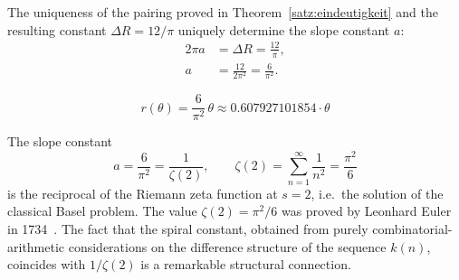 The uniqueness of the pairing proved in Theorem~\ref{satz:eindeutigkeit}
and the resulting constant $\Delta R = 12/\pi$ uniquely determine
the slope constant $a$:
\begin{align}
  2\pi a &= \Delta R = \frac{12}{\pi},\\[4pt]
  a &= \frac{12}{2\pi^2} = \frac{6}{\pi^2}.
\end{align}

\begin{theorem}
\begin{equation}
  \boxed{
    r(\theta) = \frac{6}{\pi^2}\,\theta
    \approx 0.607927101854 \cdot \theta
  }
\end{equation}
\end{theorem}

\begin{remark}
The slope constant
\[
  a = \frac{6}{\pi^2} = \frac{1}{\zeta(2)},
  \qquad
  \zeta(2) = \sum_{n=1}^{\infty} \frac{1}{n^2} = \frac{\pi^2}{6}
\]
is the reciprocal of the Riemann zeta function at $s=2$, i.e.\ the
solution of the classical Basel problem. The value $\zeta(2) = \pi^2/6$
was proved by Leonhard Euler in 1734~\cite{Euler1740,Hardy2008}. The fact
that the spiral constant, obtained from purely combinatorial-arithmetic
considerations on the difference structure of the sequence $k(n)$,
coincides with $1/\zeta(2)$ is a remarkable structural connection.
\end{remark}
